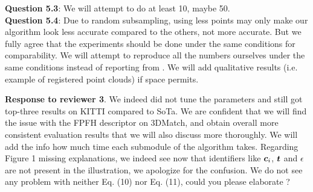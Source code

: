 \documentclass[10pt,twocolumn,letterpaper]{article}
\begin{document}
\textbf{Question 5.3}: We will attempt to do at least 10, maybe 50.\\
\textbf{Question 5.4}: Due to random subsampling, using less points may only make our algorithm look less accurate compared to the others, not more accurate. But we fully agree that the experiments should be done under the same conditions for comparability. We will attempt to reproduce all the numbers ourselves under the same conditions instead of reporting from \cite{zhang20233d}.
We will add qualitative results (i.e. example of registered point clouds) if space permits.

\textbf{Response to reviewer 3}. We indeed did not tune the parameters and still got top-three results on KITTI compared to SoTa. We are confident that we will find the issue with the FPFH descriptor on 3DMatch, and obtain overall more consistent evaluation results that we will also discuss more thoroughly. We will add the info how much time each submodule of the algorithm takes.
Regarding Figure 1 missing explanations, we indeed see now that identifiers like $\boldsymbol{c}_i$, $\boldsymbol{t}$ and $\epsilon$ are not present in the illustration, we apologize for the confusion. We do not see any problem with neither Eq. (10) nor Eq. (11), could you please elaborate ?



{
    \small
    
    
}
\end{document}
